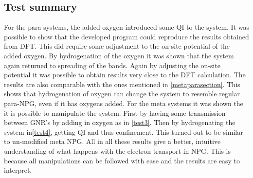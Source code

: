 \subsection{Test summary}
For the para systems, the added oxygen introduced some QI to the system. It was possible to show that the developed program could reproduce the results obtained from DFT. This did require some adjustment to the on-site potential of the added oxygen. By hydrogenation of the oxygen it was shown that the system again returned to spreading of the bands. Again by adjusting the on-site potential it was possible to obtain results very close to the DFT calculation. The results are also comparable with the ones mentioned in \cref{metaparasection}. This shows that hydrogenation of oxygen can change the system to resemble regular para-NPG, even if it has oxygens added. For the meta systems it was shown the it is possible to manipulate the system. First by having some transmission between GNR's by adding in oxygen as in \cref{test3}. Then by hydrogenating the system in\cref{test4}, getting QI and thus confinement. This turned out to be similar to un-modified meta NPG.
All in all these results give a better, intuitive understanding of what happens with the electron transport in NPG. This is because all manipulations can be followed with ease and the results are easy to interpret.
